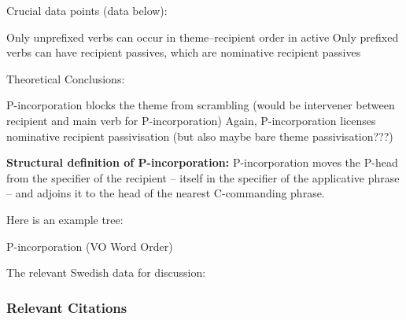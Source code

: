 \documentclass[11pt]{article}
\begin{document}
\begin{exe}
	\ex Crucial data points (data below):
	\begin{xlist}
		\ex Only unprefixed verbs can occur in theme--recipient order in active
		\ex Only prefixed verbs can have recipient passives, which are nominative recipient passives
	\end{xlist}
\end{exe}
\begin{exe}
	\ex Theoretical Conclusions:
	\begin{xlist}
		\ex P-incorporation blocks the theme from scrambling (would be intervener between recipient and main verb for P-incorporation)
		\ex Again, P-incorporation licenses nominative recipient passivisation (but also maybe bare theme passivisation???)
	\end{xlist}
\end{exe}

\textbf{Structural definition of P-incorporation:} P-incorporation moves the P-head from the specifier of the recipient -- itself in the specifier of the applicative phrase -- and adjoins it to the head of the nearest C-commanding phrase.

Here is an example tree:
\begin{exe}
\ex P-incorporation (VO Word Order)\label{ex:VO-Pincorp}\\
\end{exe}

The relevant Swedish data for discussion:

\subsubsection{Relevant Citations}
\cite{Haugen.1982,Falk.1990,Falk.1993,Holmberg.1995,Falk.1997,Anward.1989,Holmberg.2002,Lundquist.2004,Platzack.2005,Lundquist.2006,Bardal.2007,Lundquist.2013,Lundquist.2013b,Haddican.2014,Haddican.2015}
\end{document}
